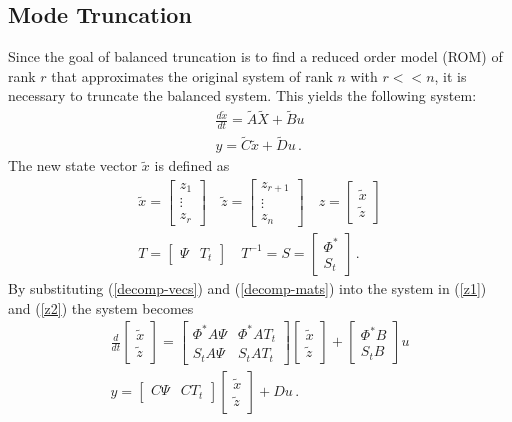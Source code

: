 \subsection{Mode Truncation}
Since the goal of balanced truncation is to find a reduced order model (ROM) of rank \(r\) that approximates the original system of rank \(n\) with \(r << n\), it is necessary to truncate the balanced system.
This yields the following system:
\begin{gather}
\frac{d\tilde{x}}{dt} = \tilde{A}\tilde{X} + \tilde{B}u \\
y = \tilde{C}\tilde{x} + \tilde{D}u  \,.
\end{gather}
The new state vector \(\tilde{x}\) is defined as
\begin{gather}
\tilde{x} = \begin{bmatrix}
z_1 \\
\vdots \\
z_r
\end{bmatrix} \quad 
\tilde{z} = \begin{bmatrix}
z_{r+1} \\
\vdots \\
z_n
\end{bmatrix} \quad
z = \begin{bmatrix}
\tilde{x} \\
\tilde{z}
\end{bmatrix} \label{decomp-vecs}\\
T = \begin{bmatrix}
\Psi & T_t
\end{bmatrix} \quad
T^{-1} = S = \begin{bmatrix}
\Phi^{*} \\
S_t
\end{bmatrix}  \,. \label{decomp-mats}
\end{gather}
By substituting (\ref{decomp-vecs}) and (\ref{decomp-mats}) into the system in (\ref{z1}) and (\ref{z2}) the system becomes
\begin{gather}
\frac{d}{dt} \begin{bmatrix}
\tilde{x} \\
\tilde{z}
\end{bmatrix} = \begin{bmatrix}
\Phi^{*}A\Psi & \Phi^{*}AT_t \\
S_tA\Psi & S_tAT_t
\end{bmatrix} \begin{bmatrix}
\tilde{x} \\
\tilde{z}
\end{bmatrix}
+ \begin{bmatrix}
\Phi^{*}B \\
S_tB
\end{bmatrix} u \\
y = \begin{bmatrix}
C \Psi & CT_t
\end{bmatrix} \begin{bmatrix}
\tilde{x} \\
\tilde{z}
\end{bmatrix} + Du
 \,.
\end{gather}
